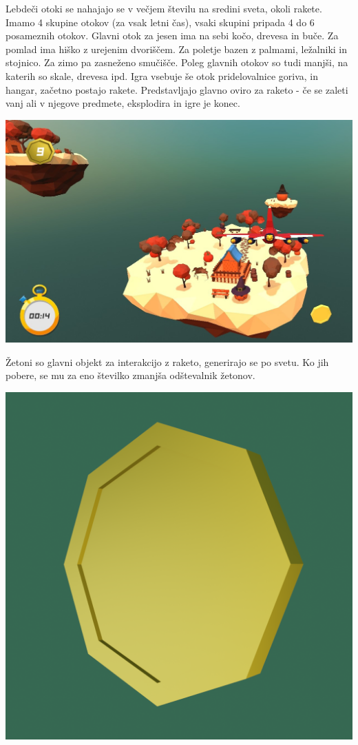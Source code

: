 \documentclass[a4paper]{article}
\begin{document}
Lebdeči otoki se nahajajo se v večjem številu na sredini sveta, okoli rakete. Imamo 4 skupine otokov (za vsak letni čas), vsaki skupini pripada 4 do 6 posameznih otokov. Glavni otok za jesen ima na sebi kočo, drevesa in buče. Za pomlad ima hiško z urejenim dvoriščem. Za poletje bazen z palmami, ležalniki in stojnico. Za zimo pa zasneženo smučišče. Poleg glavnih otokov so tudi manjši, na katerih so skale, drevesa ipd. Igra vsebuje še otok pridelovalnice goriva, in hangar, začetno postajo rakete. Predstavljajo glavno oviro za raketo - če se zaleti vanj ali v njegove predmete, eksplodira in igre je konec. 
\begin{center}
     \includegraphics[width=\columnwidth]{autumn.jpg}
\end{center}

Žetoni so glavni objekt za interakcijo z raketo, generirajo se po svetu. Ko jih pobere, se mu za eno številko zmanjša odštevalnik žetonov.
\begin{center}
     \includegraphics[width=\columnwidth]{coin1.jpg}
\end{center}
\end{document}
